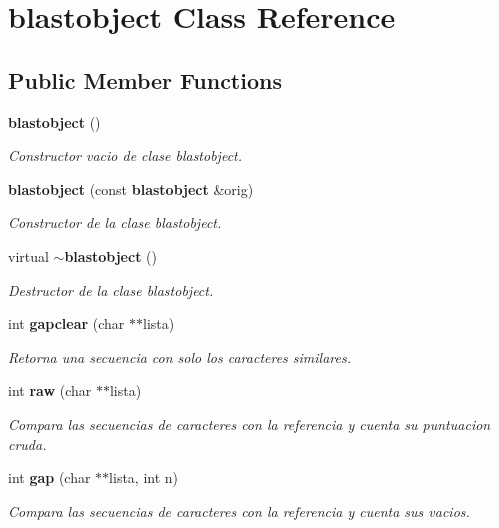 \section{blastobject Class Reference}
\label{classblastobject}
\subsection*{Public Member Functions}
\begin{DoxyCompactItemize}
\item 
\label{classblastobject_a1ed96bf0cf72600743a56b37ae6e0c16} 
{\bf blastobject} ()
\begin{DoxyCompactList}\small\item\em Constructor vacio de clase blastobject. \end{DoxyCompactList}\item 
{\bf blastobject} (const {\bf blastobject} \&orig)
\begin{DoxyCompactList}\small\item\em Constructor de la clase blastobject. \end{DoxyCompactList}\item 
\label{classblastobject_a5dcb3ba619d57005aa6ed2169fcbf5c3} 
virtual {\bf $\sim$blastobject} ()
\begin{DoxyCompactList}\small\item\em Destructor de la clase blastobject. \end{DoxyCompactList}\item 
int {\bf gapclear} (char $\ast$$\ast$lista)
\begin{DoxyCompactList}\small\item\em Retorna una secuencia con solo los caracteres similares. \end{DoxyCompactList}\item 
int {\bf raw} (char $\ast$$\ast$lista)
\begin{DoxyCompactList}\small\item\em Compara las secuencias de caracteres con la referencia y cuenta su puntuacion cruda. \end{DoxyCompactList}\item 
int {\bf gap} (char $\ast$$\ast$lista, int n)
\begin{DoxyCompactList}\small\item\em Compara las secuencias de caracteres con la referencia y cuenta sus vacios. \end{DoxyCompactList}\item 
$$
\end{DoxyCompactItemize}
